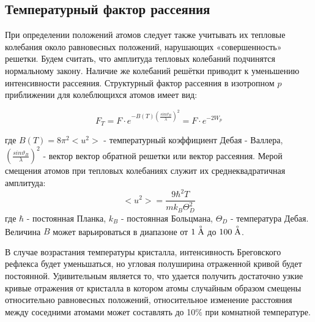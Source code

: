 \subsection{Температурный фактор рассеяния}
При определении положений атомов следует также
учитывать их тепловые колебания около равновесных
 положений, нарушающих «совершенность» решетки. Будем считать, что амплитуда
 тепловых колебаний подчинятся нормальному закону. Наличие же  колебаний
 решётки приводит к уменьшению интенсивности рассеяния.
Структурный фактор рассеяния в изотропном $p$ приближении для колеблющихся атомов
имеет вид:

 \begin{equation}
   F_T = F\cdot e^{-B(T)(\frac{sin\vartheta_B}{\lambda})^2} = F\cdot e^{-2W_p}
  \end{equation}

где $B(T) = 8 \pi^2 <u^2>$ - температурный коэффициент Дебая - Валлера, $(\frac{sin\vartheta_B}{\lambda})^2$ -
вектор вектор обратной решетки или вектор рассеяния.
Мерой смещения атомов при тепловых колебаниях служит
их среднеквадратичная амплитуда:
\begin{equation}\label{eq:debay}
  <u^2> = \frac{9\hbar^2 T}{m k_B \Theta_D^2}
 \end{equation}
где $\hbar$ - постоянная Планка, $k_B$ - постоянная Больцмана, $\Theta_D$ - температура Дебая.
Величина $B$ может варьироваться в диапазоне от $1 \angstrom $ до $ 100\angstrom $.

В случае возрастания температуры кристалла, интенсивность Бреговского рефлекса будет уменьшаться,
но угловая полуширина отраженной кривой будет постоянной. Удивительным является то, что
удается получить достаточно узкие кривые отражения от кристалла в котором атомы случайным
образом смещены относительно равновесных положений, относительное изменение расстояния
между соседними атомами может составлять до 10$\%$ при комнатной температуре.
